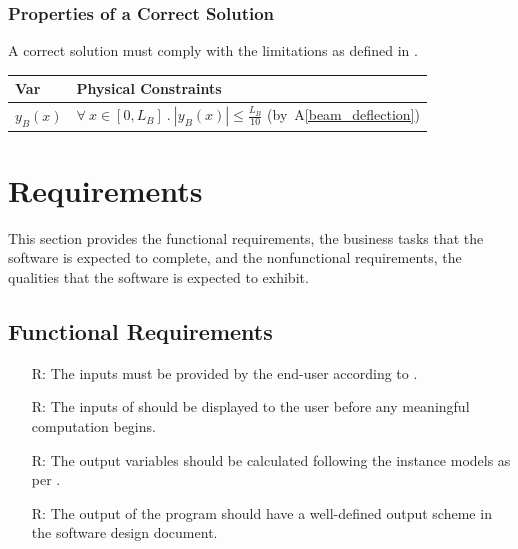 \documentclass[12pt]{article}
\newcommand{\aref}[1]{A\ref{#1}}
\newcounter{reqnum} %
\begin{document}
\subsubsection{Properties of a Correct Solution}
\label{sec_CorrectSolution}

\noindent{}A correct solution must comply with the limitations as defined in
.

\begin{table}[!h]
    \caption{Output Variables}
    \label{TblOutputVar}
    \renewcommand{\arraystretch}{1.2}
    \noindent \begin{longtable*}{l l}
        \toprule
        \textbf{Var} & \textbf{Physical Constraints} \\
        \midrule
        $y_{B}(x)$ & $\forall~x \in [0, L_B]~.~|y_{B}(x)| \leq \frac{L_B}{10}$ (by~\aref{beam_deflection})
        \\
        \bottomrule
    \end{longtable*}
\end{table}



\section{Requirements}

This section provides the functional requirements, the business tasks that the
software is expected to complete, and the nonfunctional requirements, the
qualities that the software is expected to exhibit.

\subsection{Functional Requirements}

\noindent
\begin{itemize}

    \item[R\refstepcounter{reqnum}\thereqnum \label{R_Inputs}:] The inputs must
        be provided by the end-user according to .

    \item[R\refstepcounter{reqnum}\thereqnum \label{R_OutputInputs}:] The inputs
        of \progname{} should be displayed to the user before any meaningful
        computation begins.

    \item[R\refstepcounter{reqnum}\thereqnum \label{R_Calculate}:] The output
        variables should be calculated following the instance models as per
        .

    \item[R\refstepcounter{reqnum}\thereqnum \label{R_Output}:] The output of
        the program should have a well-defined output scheme in the software
        design document.

\end{itemize}
\end{document}
